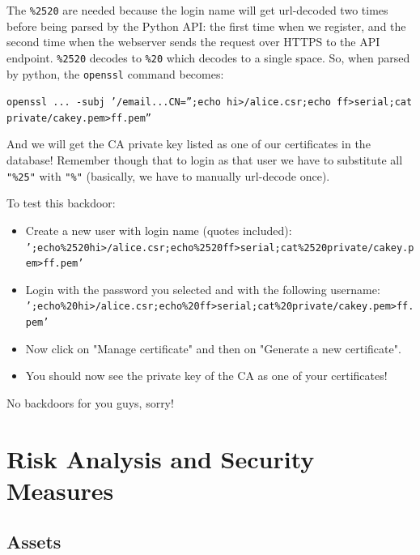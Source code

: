 \documentclass[english]{article}
\begin{document}
{The \texttt{\%2520} are needed because the login name will get url-decoded two
times before being parsed by the Python API: the first time when we register,
and the second time when the webserver sends the request over HTTPS to the API
endpoint. \texttt{\%2520} decodes to \texttt{\%20} which decodes to a single
space. So, when parsed by python, the \texttt{openssl} command becomes:

\noindent
\texttt{openssl ... -subj '/email...CN='';echo hi>/alice.csr;echo ff>serial;cat private/cakey.pem>ff.pem''}

And we will get the CA private key listed as one of our certificates in the database!
Remember though that to login as that user we have to substitute all \texttt{"\%25"} with \texttt{"\%"} (basically, we have to manually url-decode once).


To test this backdoor:
\begin{itemize}
	\item Create a new user with login name (quotes included):\\ \texttt{';echo\%2520hi>/alice.csr;echo\%2520ff>serial;cat\%2520private/cakey.pem>ff.pem'} 
	\item Login with the password you selected and with the following username:\\\texttt{';echo\%20hi>/alice.csr;echo\%20ff>serial;cat\%20private/cakey.pem>ff.pem'}
	\item Now click on "Manage certificate" and then on "Generate a new certificate".
	\item You should now see the private key of the CA as one of your certificates!
\end{itemize}



}{
	No backdoors for you guys, sorry!
}



\section{Risk Analysis and Security Measures}

\subsection{Assets}
\label{Assets}
\end{document}
